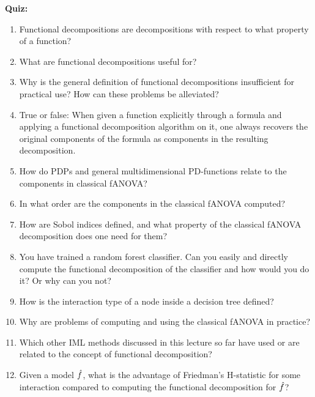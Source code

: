 \textbf{Quiz:}
\begin{enumerate}

    \item 
    Functional decompositions are decompositions with respect to what property of a function?
    \item 
    What are functional decompositions useful for?
    \item 
    Why is the general definition of functional decompositions insufficient for practical use? How can these problems be alleviated?
    \item 
    True or false: When given a function explicitly through a formula and applying a functional decomposition algorithm on it, one always recovers the original components of the formula as components in the resulting decomposition.
    \item 
    How do PDPs and general multidimensional PD-functions relate to the components in classical fANOVA?
    \item 
    In what order are the components in the classical fANOVA computed?
    \item 
    How are Sobol indices defined, and what property of the classical fANOVA decomposition does one need for them?
    \item
    You have trained a random forest classifier. Can you easily and directly compute the functional decomposition of the classifier and how would you do it? Or why can you not?
    \item 
    How is the interaction type of a node inside a decision tree defined?
    \item 
    Why are problems of computing and using the classical fANOVA in practice?
    \item 
    Which other IML methods discussed in this lecture so far have used or are related to the concept of functional decomposition?
    \item 
    Given a model $\hat{f}$, what is the advantage of Friedman's H-statistic for some interaction compared to computing the functional decomposition for $\hat{f}$?

\end{enumerate}